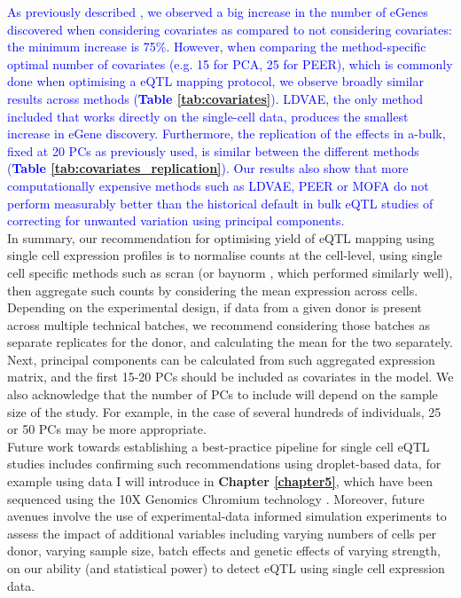 \textcolor{blue}{As previously described \cite{stegle2012using}, we observed a big increase in the number of eGenes discovered when considering covariates as compared to not considering covariates: the minimum increase is 75\%. 
However, when comparing the method-specific optimal number of covariates (e.g. 15 for PCA, 25 for PEER), which is commonly done when optimising a eQTL mapping protocol, we observe broadly similar results across methods (\textbf{Table \ref{tab:covariates}}).
LDVAE, the only method included that works directly on the single-cell data, produces the smallest increase in eGene discovery. 
Furthermore, the replication of the effects in a-bulk, fixed at 20 PCs as previously used, is similar between the different methods (\textbf{Table \ref{tab:covariates_replication}}). 
Our results also show that more computationally expensive methods such as LDVAE, PEER or MOFA do not perform measurably better than the historical default in bulk eQTL studies of correcting for unwanted variation using principal components.} \\

In summary, our recommendation for optimising yield of eQTL mapping using single cell expression profiles is to normalise counts at the cell-level, using single cell specific methods such as scran \cite{lun2016step} (or baynorm \cite{tang2020baynorm}, which performed similarly well), then aggregate such counts by considering the mean expression across cells.
Depending on the experimental design, if data from a given donor is present across multiple technical batches, we recommend considering those batches as separate replicates for the donor, and calculating the mean for the two separately.
Next, principal components can be calculated from such aggregated expression matrix, and the first 15-20 PCs should be included as covariates in the model.
We also acknowledge that the number of PCs to include will depend on the sample size of the study.
For example, in the case of several hundreds of individuals, 25 or 50 PCs may be more appropriate. \\


Future work towards establishing a best-practice pipeline for single cell eQTL studies includes confirming such recommendations using droplet-based data, for example using data I will introduce in \textbf{Chapter \ref{chapter5}}, which have been sequenced using the 10X Genomics Chromium technology \cite{zheng2017massively}. 
Moreover, future avenues involve the use of experimental-data informed simulation experiments to assess the impact of additional variables including varying numbers of cells per donor, varying sample size, batch effects and genetic effects of varying strength, on our ability (and statistical power) to detect eQTL using single cell expression data.

